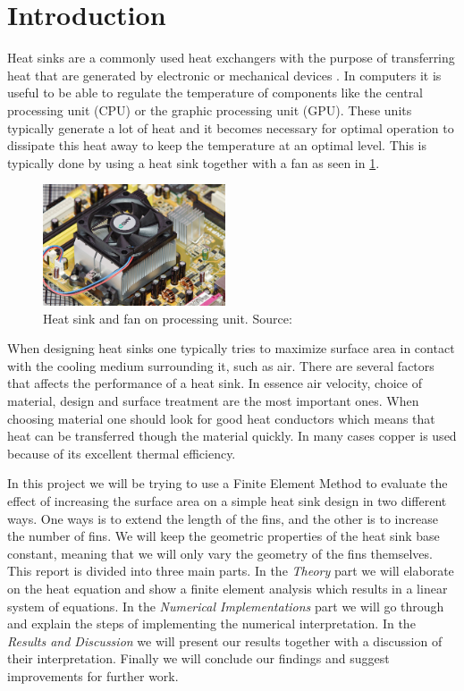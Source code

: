 \section{Introduction}
Heat sinks are a commonly used heat exchangers with the purpose of transferring heat that are generated by electronic or mechanical devices \cite{wiki_hs}. In computers it is useful to be able to regulate the temperature of components like the central processing unit (CPU) or the graphic processing unit	(GPU). These units typically generate a lot of heat and it becomes necessary for optimal operation to dissipate this heat away to keep the temperature at an optimal level. This is typically done by using a heat sink together with a fan as seen in \cref{fig:heatsink_and_fan}. 

\begin{figure}
	\begin{center}
		\includegraphics[width=0.48\textwidth]{../figures/heatsink_and_fan.jpg}
	\end{center}
	\caption{Heat sink and fan on processing unit. Source: \cite{wiki_hs}}
    \label{fig:heatsink_and_fan}
\end{figure}

When designing heat sinks one typically tries to maximize surface area in contact with the cooling medium surrounding it, such as air. There are several factors that affects the performance of a heat sink. In essence air velocity, choice of material, design and surface treatment are the most important ones. When choosing material one should look for good heat conductors which means that heat can be transferred though the material quickly. In many cases copper is used because of its excellent thermal efficiency.

In this project we will be trying to use a Finite Element Method to evaluate the effect of increasing the surface area on a simple heat sink design in two different ways. One ways is to extend the length of the fins, and the other is to increase the number of fins. We will keep the geometric properties of the heat sink base constant, meaning that we will only vary the geometry of the fins themselves. This report is divided into three main parts. In the \textit{Theory} part we will elaborate on the heat equation and show a finite element analysis which results in a linear system of equations. In the \textit{Numerical Implementations} part we will go through and explain the steps of implementing the numerical interpretation. In the \textit{Results and Discussion} we will present our results together with a discussion of their interpretation. Finally we will conclude our findings and suggest improvements for further work. %
